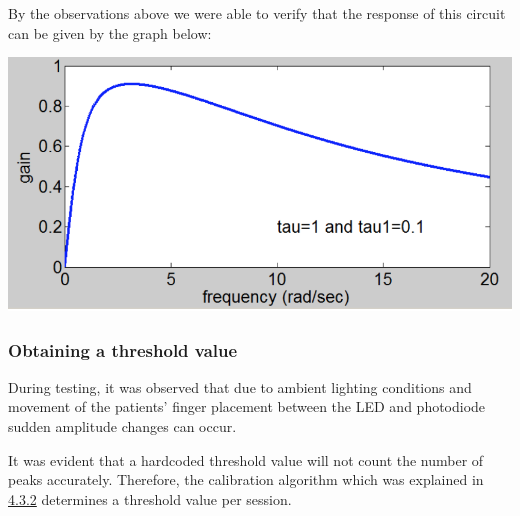 \documentclass[12pt]{article}
\begin{document}
{By the observations above we were able to verify that the response of this circuit can be given by the graph below:
\begin{center}
	

\includegraphics[scale=0.5]{bandpass.jpg}
\end{center}
\subsubsection{Obtaining a threshold value}

During testing, it was observed that due to ambient lighting conditions and movement of the patients’ finger placement between the LED and photodiode sudden amplitude changes can occur. 

It was evident that a hardcoded threshold value will not count the number of peaks accurately. Therefore, the calibration algorithm which was explained in \hyperref[sec:4.3.2]{4.3.2} determines a threshold value per session.


\begin{figure}[!htbp]
	

\end{figure}}
\end{document}

